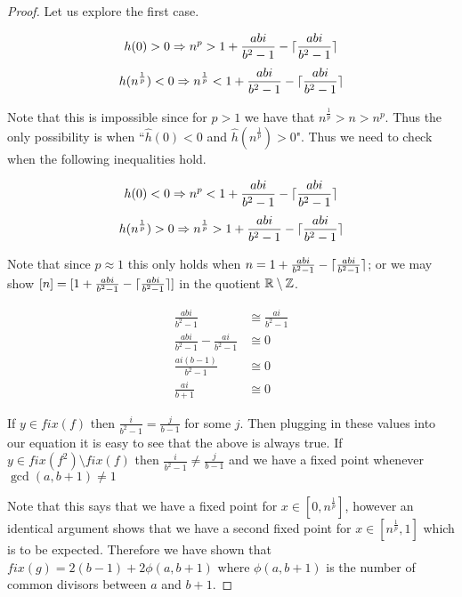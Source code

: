 \documentclass[11pt,oneside,draft]{amsart}
\numberwithin{equation}{section} %
\numberwithin{figure}{section} %
\begin{document}
\begin{proof}
Let us explore the first case. 

\[h(0)>0 \Rightarrow n^p > 1+\frac{abi}{b^2-1}-\lceil\frac{abi}{b^2-1}\rceil\]
 \[ h(n^{\frac{1}{p}})<0 \Rightarrow n^{\frac{1}{p}}< 1+\frac{abi}{b^2-1}-\lceil\frac{abi}{b^2-1}\rceil
\]

Note that this is impossible since for $p>1$ we have that $n^{\frac{1}{p}}>n>n^p$. Thus the 
only possibility is when ``$\hat{h}(0)<0$ and $\hat{h}(n^{\frac{1}{p}})>0$". Thus we need 
to check when the following inequalities hold.  

\[h(0)<0 \Rightarrow n^p < 1+\frac{abi}{b^2-1}-\lceil\frac{abi}{b^2-1}\rceil\]
 \[ h(n^{\frac{1}{p}})>0 \Rightarrow n^{\frac{1}{p}}> 1+\frac{abi}{b^2-1}-\lceil\frac{abi}{b^2-1}\rceil
\]

Note that since $p\approx 1$ this only holds when $n=1+\frac{abi}{b^2-1}-\lceil\frac{abi}{b^2-1}\rceil$;
or we may show $[n]=[1+\frac{abi}{b^2-1}-\lceil\frac{abi}{b^2-1}\rceil ]$ in the 
quotient $\mathbb{R} \setminus \mathbb{Z}$. 



\begin{align*}
\frac{abi}{b^2-1} &\cong \frac{ai}{b^2-1} \\ 
\frac{abi}{b^2-1}- \frac{ai}{b^2-1} & \cong 0 \\
\frac{ai(b-1)}{b^2-1} & \cong 0 \\
\frac{ai}{b+1}& \cong 0
\end{align*}

If $y\in fix(f)$ then $\frac{i}{b^2-1}=\frac{j}{b-1}$ for some $j$. Then plugging in these 
values into our equation it is easy to see that the above is always true. If $y\in 
fix(f^2)\setminus fix(f)$ then $\frac{i}{b^2-1}\not =\frac{j}{b-1}$ and we have a fixed 
point whenever $\gcd (a, b+1) \not=1$ 

Note that this says that we have a fixed point for $x\in [0, n^\frac{1}{p}]$, however an 
identical argument shows that we have a second fixed point for $x\in [n^\frac{1}{p}, 1]$ 
which is to be expected. Therefore we have shown that $fix(g)= 2(b-1)+2\phi (a, b+1)$ where $\phi (a, b+1)$ is the number of common divisors between $a$ and $b+1$. 
\end{proof}






\end{document}
